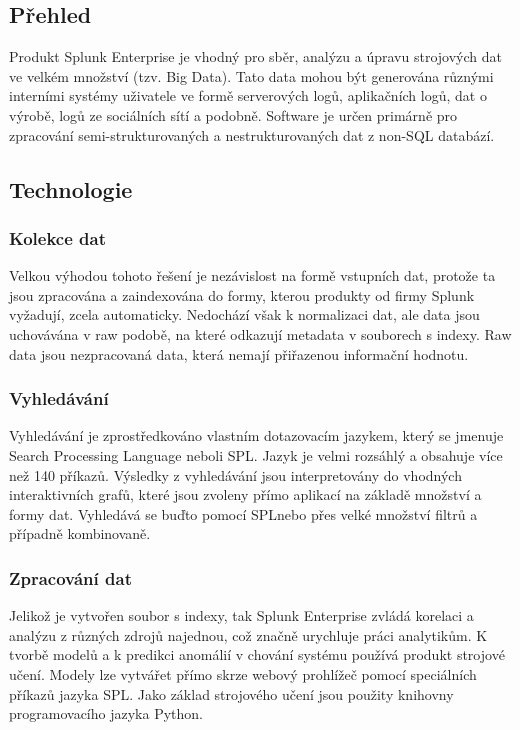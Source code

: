 \documentclass[czech,BP]{thesiskiv}
\begin{document}
\subsection{Přehled}
Produkt Splunk Enterprise je vhodný pro sběr, analýzu a úpravu strojových dat ve velkém množství (tzv. Big Data). Tato data mohou být generována různými interními systémy uživatele ve formě serverových logů, aplikačních logů, dat o výrobě, logů ze sociálních sítí a podobně. Software je určen primárně pro zpracování semi-strukturovaných a nestrukturovaných dat z non-SQL databází.

\subsection{Technologie}
\subsubsection{Kolekce dat}
Velkou výhodou tohoto řešení je nezávislost na formě vstupních dat, protože ta jsou zpracována a zaindexována do formy, kterou produkty od firmy Splunk vyžadují, zcela automaticky. Nedochází však k normalizaci dat, ale data jsou uchovávána v raw podobě, na které odkazují metadata v souborech s indexy. Raw data jsou nezpracovaná data, která nemají přiřazenou informační hodnotu.

\subsubsection{Vyhledávání}
Vyhledávání je zprostředkováno vlastním dotazovacím jazykem, který se jmenuje Search Processing Language neboli SPL\texttrademark. Jazyk je velmi rozsáhlý a obsahuje více než 140 příkazů. Výsledky z vyhledávání jsou interpretovány do vhodných interaktivních grafů, které jsou zvoleny přímo aplikací na základě množství a formy dat. Vyhledává se buďto pomocí SPL\texttrademark nebo přes velké množství filtrů a případně kombinovaně. \cite{Operational_intelligence}

\subsubsection{Zpracování dat}
Jelikož je vytvořen soubor s indexy, tak Splunk Enterprise zvládá korelaci a analýzu z různých zdrojů najednou, což značně urychluje práci analytikům. K tvorbě modelů a k predikci anomálií v chování systému používá produkt strojové učení. Modely lze vytvářet přímo skrze webový prohlížeč pomocí speciálních příkazů jazyka SPL\texttrademark. Jako základ strojového učení jsou použity knihovny programovacího jazyka Python. \cite{MachineLearning}
\end{document}

